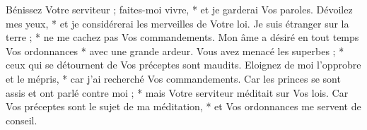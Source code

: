 Bénissez Votre serviteur ; faites-moi vivre, * et je garderai Vos paroles.
\versseparator
Dévoilez mes yeux, * et je considérerai les merveilles de Votre loi.
\versseparator
Je suis étranger sur la terre ; * ne me cachez pas Vos commandements.
\versseparator
Mon âme a désiré en tout temps Vos ordonnances * avec une grande ardeur.
\versseparator
Vous avez menacé les superbes ; * ceux qui se détournent de Vos préceptes sont maudits.
\versseparator
Eloignez de moi l'opprobre et le mépris, * car j'ai recherché Vos commandements.
\versseparator
Car les princes se sont assis et ont parlé contre moi ; * mais Votre serviteur méditait sur Vos lois.
\versseparator
Car Vos préceptes sont le sujet de ma méditation, * et Vos ordonnances me servent de conseil.